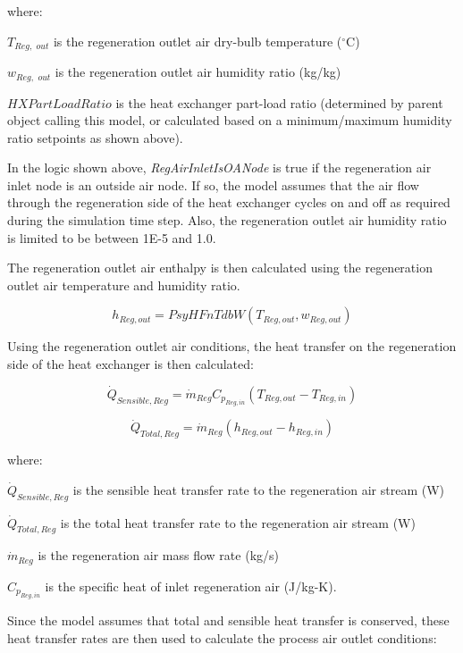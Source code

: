 where:

\({T_{Reg,\,\,out}}\) is the regeneration outlet air dry-bulb temperature (\(^{\circ}\)C)

\({w_{Reg,\,\,out}}\) is the regeneration outlet air humidity ratio (kg/kg)

\(HXPartLoadRatio\) is the heat exchanger part-load ratio (determined by parent object calling this model, or calculated based on a minimum/maximum humidity ratio setpoints as shown above).

In the logic shown above, \emph{RegAirInletIsOANode} is true if the regeneration air inlet node is an outside air node. If so, the model assumes that the air flow through the regeneration side of the heat exchanger cycles on and off as required during the simulation time step. Also, the regeneration outlet air humidity ratio is limited to be between 1E-5 and 1.0.

The regeneration outlet air enthalpy is then calculated using the regeneration outlet air temperature and humidity ratio.

\begin{equation}
{h_{Reg,out}} = PsyHFnTdbW\left( {{T_{Reg,out}},{w_{Reg,out}}} \right)
\end{equation}

Using the regeneration outlet air conditions, the heat transfer on the regeneration side of the heat exchanger is then calculated:

\begin{equation}
{\dot{Q}_{Sensible,Reg}} = {\dot{m}_{Reg}}{C_{p_{Reg,in}}} \left( {{T_{Reg,out}} - {T_{Reg,in}}} \right)
\end{equation}

\begin{equation}
{\dot{Q}_{Total,Reg}} = {\dot{m}_{Reg}} \left( {{h_{Reg,out}} - {h_{Reg,in}}} \right)
\end{equation}

where:

\({\dot{Q}_{Sensible,Reg}}\) is the sensible heat transfer rate to the regeneration air stream (W)

\({\dot{Q}_{Total,Reg}}\) is the total heat transfer rate to the regeneration air stream (W)

\({\dot{m}_{Reg}}\) is the regeneration air mass flow rate (kg/s)

\({C_{p_{Reg,in}}}\) is the specific heat of inlet regeneration air (J/kg-K).

Since the model assumes that total and sensible heat transfer is conserved, these heat transfer rates are then used to calculate the process air outlet conditions:

